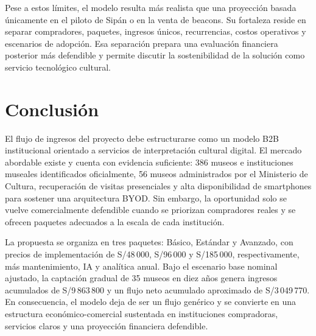 Pese a estos límites, el modelo resulta más realista que una proyección basada únicamente en el piloto de Sipán o en la venta de beacons. Su fortaleza reside en separar compradores, paquetes, ingresos únicos, recurrencias, costos operativos y escenarios de adopción. Esa separación prepara una evaluación financiera posterior más defendible y permite discutir la sostenibilidad de la solución como servicio tecnológico cultural.

\section{Conclusión}

El flujo de ingresos del proyecto debe estructurarse como un modelo B2B institucional orientado a servicios de interpretación cultural digital. El mercado abordable existe y cuenta con evidencia suficiente: 386 museos e instituciones museales identificados oficialmente, 56 museos administrados por el Ministerio de Cultura, recuperación de visitas presenciales y alta disponibilidad de smartphones para sostener una arquitectura BYOD. Sin embargo, la oportunidad solo se vuelve comercialmente defendible cuando se priorizan compradores reales y se ofrecen paquetes adecuados a la escala de cada institución.

La propuesta se organiza en tres paquetes: Básico, Estándar y Avanzado, con precios de implementación de S/48\,000, S/96\,000 y S/185\,000, respectivamente, más mantenimiento, IA y analítica anual. Bajo el escenario base nominal ajustado, la captación gradual de 35 museos en diez años genera ingresos acumulados de S/9\,863\,800 y un flujo neto acumulado aproximado de S/3\,049\,770. En consecuencia, el modelo deja de ser un flujo genérico y se convierte en una estructura económico-comercial sustentada en instituciones compradoras, servicios claros y una proyección financiera defendible.
